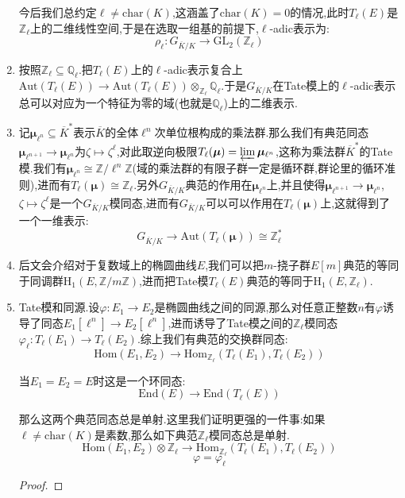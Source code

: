 \begin{enumerate}
	今后我们总约定$\ell\not=\mathrm{char}(K)$,这涵盖了$\mathrm{char}(K)=0$的情况,此时$T_{\ell}(E)$是$\mathbb{Z}_{\ell}$上的二维线性空间,于是在选取一组基的前提下,$\ell$-adic表示为:
	$$\rho_{\ell}:G_{\overline{K}/K}\to\mathrm{GL}_2(\mathbb{Z}_{\ell})$$
	\item 按照$\mathbb{Z}_{\ell}\subseteq\mathbb{Q}_{\ell}$.把$T_{\ell}(E)$上的$\ell$-adic表示复合上$\mathrm{Aut}(T_{\ell}(E))\to\mathrm{Aut}(T_{\ell}(E))\otimes_{\mathbb{Z}_{\ell}}\mathbb{Q}_{\ell}$.于是$G_{\overline{K}/K}$在Tate模上的$\ell$-adic表示总可以对应为一个特征为零的域(也就是$\mathbb{Q}_{\ell}$)上的二维表示.
	\item 记$\bm{\mu}_{\ell^n}\subseteq\overline{K}^*$表示$\overline{K}$的全体$\ell^n$次单位根构成的乘法群.那么我们有典范同态$\bm{\mu}_{\ell^{n+1}}\to\bm{\mu}_{\ell^n}$为$\zeta\mapsto\zeta^{\ell}$,对此取逆向极限$T_{\ell}(\bm{\mu})=\varprojlim\bm{\mu}_{\ell^n}$,这称为乘法群$\overline{K}^*$的Tate模.我们有$\bm{\mu}_{\ell^n}\cong\mathbb{Z}/\ell^n\mathbb{Z}$(域的乘法群的有限子群一定是循环群,群论里的循环准则),进而有$T_{\ell}(\bm{\mu})\cong\mathbb{Z}_{\ell}$.另外$G_{\overline{K}/K}$典范的作用在$\bm{\mu}_{\ell^n}$上,并且使得$\bm{\mu}_{\ell^{n+1}}\to\bm{\mu}_{\ell^n}$,$\zeta\mapsto\zeta^{\ell}$是一个$G_{\overline{K}/K}$模同态,进而有$G_{\overline{K}/K}$可以可以作用在$T_{\ell}(\bm{\mu})$上,这就得到了一个一维表示:
	$$G_{\overline{K}/K}\to\mathrm{Aut}(T_{\ell}(\bm{\mu}))\cong\mathbb{Z}_{\ell}^*$$
	\item 后文会介绍对于复数域上的椭圆曲线$E$,我们可以把$m$-挠子群$E[m]$典范的等同于同调群$\mathrm{H}_1(E,\mathbb{Z}/m\mathbb{Z})$,进而把Tate模$T_{\ell}(E)$典范的等同于$\mathrm{H}_1(E,\mathbb{Z}_{\ell})$.
	\item Tate模和同源.设$\varphi:E_1\to E_2$是椭圆曲线之间的同源,那么对任意正整数$n$有$\varphi$诱导了同态$E_1[\ell^n]\to E_2[\ell^n]$,进而诱导了Tate模之间的$\mathbb{Z}_{\ell}$模同态$\varphi_{\ell}:T_{\ell}(E_1)\to T_{\ell}(E_2)$.综上我们有典范的交换群同态:
	$$\mathrm{Hom}(E_1,E_2)\to\mathrm{Hom}_{\mathbb{Z}_{\ell}}(T_{\ell}(E_1),T_{\ell}(E_2))$$
	
	当$E_1=E_2=E$时这是一个环同态:
	$$\mathrm{End}(E)\to\mathrm{End}(T_{\ell}(E))$$
	
	那么这两个典范同态总是单射.这里我们证明更强的一件事:如果$\ell\not=\mathrm{char}(K)$是素数,那么如下典范$\mathbb{Z}_{\ell}$模同态总是单射.
	$$\mathrm{Hom}(E_1,E_2)\otimes\mathbb{Z}_{\ell}\to\mathrm{Hom}_{\mathbb{Z}_{\ell}}(T_{\ell}(E_1),T_{\ell}(E_2))$$
	$$\varphi=\varphi_{\ell}$$	
	\begin{proof}
		

\end{proof}
\end{enumerate}

